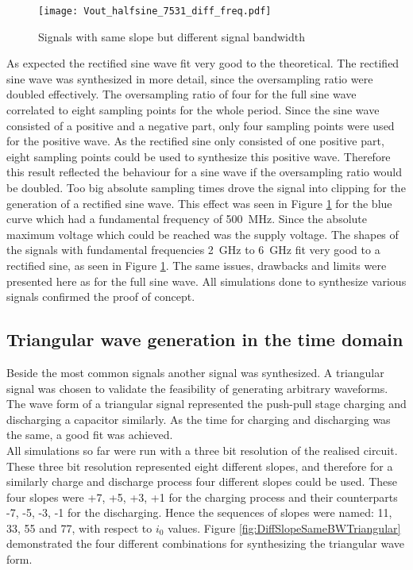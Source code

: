 \begin{figure}[htb!]
	\centering
  \texttt{[image: Vout\_halfsine\_7531\_diff\_freq.pdf]}
	\caption{Signals with same slope but different signal bandwidth}
	\label{fig:DiffSigBWSameSlope}
\end{figure}

As expected the rectified sine wave fit very good to the theoretical.
The rectified sine wave was synthesized in more detail, since the oversampling ratio were doubled effectively.
The oversampling ratio of four for the full sine wave correlated to eight sampling points for the whole period.
Since the sine wave consisted of a positive and a negative part, only four sampling points were used for the positive wave.
As the rectified sine only consisted of one positive part, eight sampling points could be used to synthesize this positive wave.
Therefore this result reflected the behaviour for a sine wave if the oversampling ratio would be doubled.
Too big absolute sampling times drove the signal into clipping for the generation of a rectified sine wave.
This effect was seen in Figure \ref{fig:DiffSigBWSameSlope} for the blue curve which had a fundamental frequency of \SI{500}{\mega \hertz}.
Since the absolute maximum voltage which could be reached was the supply voltage.
The shapes of the signals with fundamental frequencies \SI{2}{\giga \hertz} to \SI{6}{\giga \hertz} fit very good to a rectified sine, as seen in Figure \ref{fig:DiffSigBWSameSlope}.
The same issues, drawbacks and limits were presented here as for the full sine wave.
All simulations done to synthesize various signals confirmed the proof of concept.



\subsection{Triangular wave generation in the time domain}
Beside the most common signals another signal was synthesized.
A triangular signal was chosen to validate the feasibility of generating arbitrary waveforms.
The wave form of a triangular signal represented the push-pull stage charging and discharging a capacitor similarly.
As the time for charging and discharging was the same, a good fit was achieved.\\
All simulations so far were run with a three bit resolution of the realised circuit.
These three bit resolution represented eight different slopes, and therefore for a similarly charge and discharge process four different slopes could be used.
These four slopes were +7, +5, +3, +1 for the charging process and their counterparts -7, -5, -3, -1 for the discharging.
Hence the sequences of slopes were named: 11, 33, 55 and 77, with respect to $i_0$ values.
Figure \ref{fig:DiffSlopeSameBWTriangular} demonstrated the four different combinations for synthesizing the triangular wave form.

